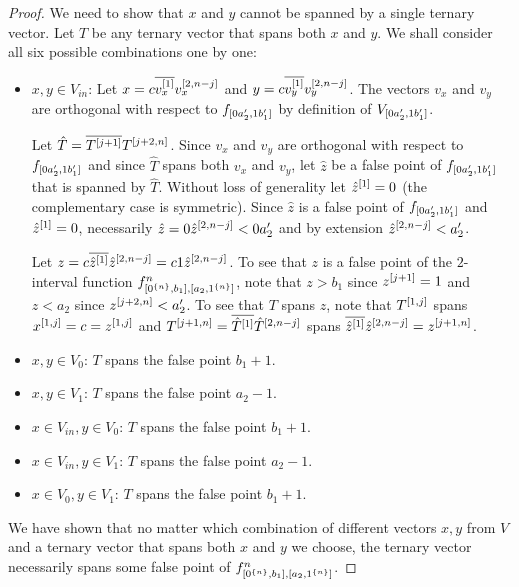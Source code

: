 \begin{proof}
We need to show that $x$ and $y$
cannot be spanned by a single ternary vector.
Let $T$ be any ternary vector that spans both $x$ and $y$.
We shall consider all six possible combinations
one by one:
\begin{itemize}
\item $x,y \in V_{in}$:
Let $x = c \overline{v_x^{[1]}} v_x^{[2, n-j]}$
and $y = c \overline{v_y^{[1]}} v_y^{[2, n-j]}$.
The vectors $v_x$ and $v_y$ are orthogonal with respect to $f_{[0 a_2', 1 b_1']}$
by definition of $V_{[0 a_2', 1 b_1']}$.

Let $\hat{T} = \overline{T^{[j+1]}} T^{[j+2, n]}$.
Since $v_x$ and $v_y$ are orthogonal with respect to
$f_{[0 a_2', 1 b_1']}$
and since $\hat{T}$ spans both $v_x$ and $v_y$,
let $\hat{z}$ be a false point
of $f_{[0 a_2', 1 b_1']}$
that is spanned by $\hat{T}$.
Without loss of generality let $\hat{z}^{[1]} = 0$
(the complementary case is symmetric).
Since $\hat{z}$ is a false point
of $f_{[0 a_2', 1 b_1']}$
and $\hat{z}^{[1]} = 0$,
necessarily
$\hat{z} = 0 \hat{z}^{[2, n-j]} < 0 a_2'$
and by extension
$\hat{z}^{[2, n-j]} < a_2'$.

Let $z
= c \overline{\hat{z}^{[1]}} \hat{z}^{[2, n-j]}
= c 1 \hat{z}^{[2, n-j]}$.
To see that $z$ is a false point of
the $2$-interval function $f^{n}_{[0^{\{n\}}, b_1], [a_2, 1^{\{n\}}]}$,
note that $z > b_1$ since $z^{[j+1]} = 1$
and $z < a_2$ since $z^{[j+2, n]} < a_2'$.
To see that $T$ spans $z$,
note that
$T^{[1, j]}$ spans
$x^{[1, j]} = c = z^{[1, j]}$
and $T^{[j+1, n]} = \overline{\hat{T}^{[1]}} \hat{T}^{[2, n-j]}$ spans $\overline{\hat{z}^{[1]}} \hat{z}^{[2, n-j]} = z^{[j+1, n]}$.
\item $x,y \in V_0$:
$T$ spans the false point $b_1 + 1$.
\item $x,y \in V_1$:
$T$ spans the false point $a_2 - 1$.
\item $x \in V_{in}, y \in V_0$:
$T$ spans the false point $b_1 + 1$.
\item $x \in V_{in}, y \in V_1$:
$T$ spans the false point $a_2 - 1$.
\item $x \in V_0, y \in V_1$:
$T$ spans the false point $b_1 + 1$.
\end{itemize}

We have shown that no matter which combination
of different vectors $x, y$ from $V$
and a ternary vector that spans both $x$ and $y$
we choose,
the ternary vector necessarily spans some false point
of $f^{n}_{[0^{\{n\}}, b_1], [a_2, 1^{\{n\}}]}$.
\end{proof}

